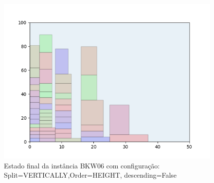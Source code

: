 \begin{figure}[H]
    \centering
    \caption[]{Estado final da instância BKW06 com configuração: Split=VERTICALLY,Order=HEIGHT, descending=False}
    \label{fig:bkw06-vertically-height-false}
    \includegraphics[scale=0.5]{output/figures/bkw/bkw06/vertically/height/false/00}
\end{figure}
